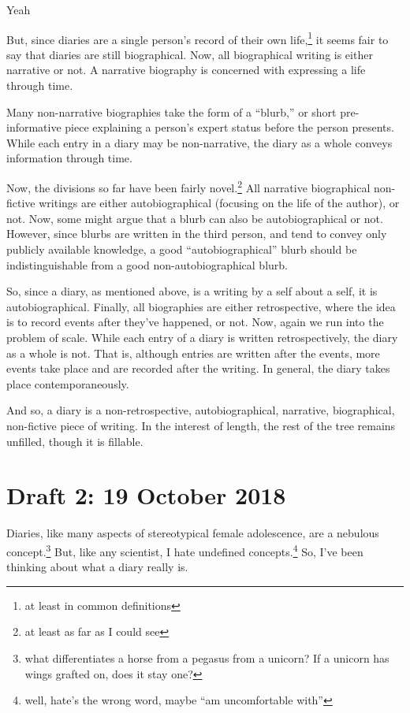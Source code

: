 Yeah \documentclass[12pt]{article}[titlepage]
\newcommand{\say}[1]{``#1''}
\newcommand{\1}{\={a}}
\newcommand{\2}{\={e}}
\newcommand{\3}{\={\i}}
\newcommand{\4}{\=o}
\newcommand{\5}{\=u}
\newcommand{\6}{\={A}}
\renewcommand{\,}{\textsuperscript{,}}
\begin{document}
But, since diaries are a single person's record of their own life,\footnote{at least in common definitions} it seems fair to say that diaries are still biographical.
Now, all biographical writing is either narrative or not.
A narrative biography is concerned with expressing a life through time.

Many non-narrative biographies take the form of a \say{blurb,} or short pre-informative piece explaining a person's expert status before the person presents.
While each entry in a diary may be non-narrative, the diary as a whole conveys information through time.

Now, the divisions so far have been fairly novel.\footnote{at least as far as I could see}
All narrative biographical non-fictive writings are either autobiographical (focusing on the life of the author), or not.
Now, some might argue that a blurb can also be autobiographical or not.
However, since blurbs are written in the third person, and tend to convey only publicly available knowledge, a good \say{autobiographical} blurb should be indistinguishable from a good non-autobiographical blurb.

So, since a diary, as mentioned above, is a writing by a self about a self, it is autobiographical.
Finally, all biographies are either retrospective, where the idea is to record events after they've happened, or not.
Now, again we run into the problem of scale.
While each entry of a diary is written retrospectively, the diary as a whole is not.
That is, although entries are written after the events, more events take place and are recorded after the writing.
In general, the diary takes place contemporaneously.

And so, a diary is a non-retrospective, autobiographical, narrative, biographical, non-fictive piece of writing.
In the interest of length, the rest of the tree remains unfilled, though it is fillable.

\section{Draft 2: 19 October 2018}
Diaries, like many aspects of stereotypical female adolescence, are a nebulous concept.\footnote{what differentiates a horse from a pegasus from a unicorn? If a unicorn has wings grafted on, does it stay one?}
But, like any scientist, I hate undefined concepts.\footnote{well, hate's the wrong word, maybe \say{am uncomfortable with}}
So, I've been thinking about what a diary really is.
\end{document}
